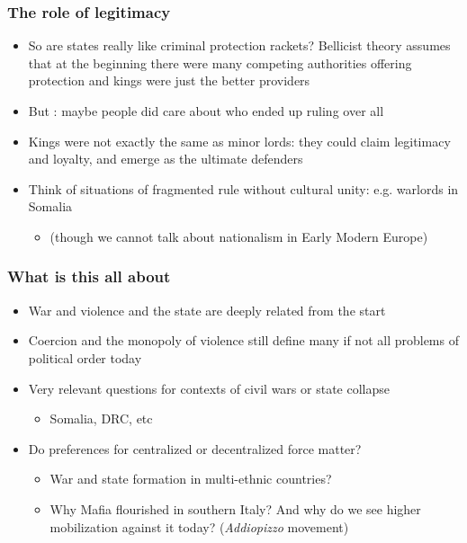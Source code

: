 \documentclass[aspectratio=43]{beamer}
\begin{document}
\begin{frame}
\frametitle{The role of legitimacy}
\centering

\begin{itemize}
  \item So are states really like criminal protection rackets? Bellicist theory assumes that at the beginning there were many competing authorities offering protection and kings were just the better providers
  \item But : maybe people did care about who ended up ruling over all
  \item Kings were not exactly the same as minor lords: they could claim legitimacy and loyalty, and emerge as the ultimate defenders
  \item Think of situations of fragmented rule without cultural unity: e.g. warlords in Somalia
  \begin{itemize}
    \item (though we cannot talk about nationalism in Early Modern Europe)
  \end{itemize}
\end{itemize}

\end{frame}

\begin{frame}
\frametitle{What is this all about}
\centering

\begin{itemize}
  \item War and violence and the state are deeply related from the start
  \item Coercion and the monopoly of violence still define many if not all problems of political order today
  \item<2-> Very relevant questions for contexts of civil wars or state collapse
  \begin{itemize}
    \item Somalia, DRC, etc
  \end{itemize}
  \item<2-> Do preferences for centralized or decentralized force matter?
  \begin{itemize}[<+->]
    \item War and state formation in multi-ethnic countries?
    \item Why Mafia flourished in southern Italy? And why do we see higher mobilization against it today? (\textit{Addiopizzo} movement)
  \end{itemize}
\end{itemize}

\end{frame}
\end{document}
